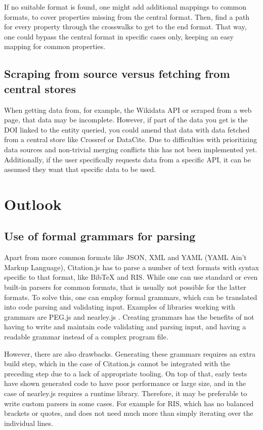 \documentclass[fleqn,10pt,lineno]{wlpeerj} %
\begin{document}
If no suitable format is found, one might add additional mappings to common formats, to cover properties missing from the central format. Then, find a path for every property through the crosswalks to get to the end format. That way, one could bypass the central format in specific cases only, keeping an easy mapping for common properties.

\subsection*{Scraping from source versus fetching from central stores}

When getting data from, for example, the Wikidata API or scraped from a web page, that data may be incomplete. However, if part of the data you get is the DOI linked to the entity queried, you could amend that data with data fetched from a central store like Crossref or DataCite. Due to difficulties with prioritizing data sources and non-trivial merging conflicts this has not been implemented yet. Additionally, if the user specifically requests data from a specific API, it can be assumed they want that specific data to be used.

\section*{Outlook}

\subsection*{Use of formal grammars for parsing}

Apart from more common formats like JSON, XML and YAML (YAML Ain't Markup Language), Citation.js has to parse a number of text formats with syntax specific to that format, like BibTeX and RIS. While one can use standard or even built-in parsers for common formats, that is usually not possible for the latter formats.
To solve this, one can employ formal grammars, which can be translated into code parsing and validating input. Examples of libraries working with grammars are PEG.js \citep{Majda2018pegjs/pegjs} and nearley.js \citep{Kartik2018kach/nearley}. Creating grammars has the benefits of not having to write and maintain code validating and parsing input, and having a readable grammar instead of a complex program file.

However, there are also drawbacks. Generating these grammars requires an extra build step, which in the case of Citation.js cannot be integrated with the preceding step due to a lack of appropriate tooling. On top of that, early tests have shown generated code to have poor performance or large size, and in the case of nearley.js requires a runtime library. Therefore, it may be preferable to write custom parsers in some cases. For example for RIS, which has no balanced brackets or quotes, and does not need much more than simply iterating over the individual lines.
\end{document}
